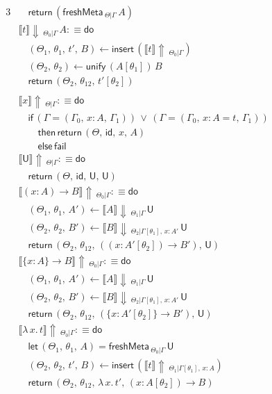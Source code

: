 \documentclass[acmsmall,review,anonymous,prologue,dvipsnames]{acmart}\settopmatter{printfolios=true,printccs=false,printacmref=false}
\newcommand{\slet}{\boldsymbol{\mathsf{let}}}
\renewcommand{\U}{\mathsf{U}}
\newcommand{\id}{\mathsf{id}}
\newcommand{\freshMeta}[3]{\mathsf{freshMeta}\,_{#1|#2}\,#3}
\newcommand{\unify}{\mathsf{unify}}
\newcommand{\fail}{\mathsf{fail}}
\newcommand{\echeck}[4]{\llbracket#1\rrbracket\!\Downarrow\,_{#2|#3}\,#4}
\newcommand{\einfer}[3]{\llbracket#1\rrbracket\!\Uparrow\,_{#2|#3}}
\newcommand{\edo}{\boldsymbol{\mathsf{do}}}
\newcommand{\ereturn}{\boldsymbol{\mathsf{return}}}
\newcommand{\eif}{\boldsymbol{\mathsf{if}}}
\newcommand{\ethen}{\boldsymbol{\mathsf{then}}}
\newcommand{\eelse}{\boldsymbol{\mathsf{else}}}
\newcommand{\einsert}{\mathsf{insert}}
\theoremstyle{remark}
\begin{document}
\begin{alignat*}{3}
  &\quad\ereturn\,(\freshMeta{\Theta}{\Gamma}{A})\\
  &\echeck{t}{\Theta_0}{\Gamma}{A} :\equiv \edo \\
  &\quad(\Theta_1,\,\theta_1,\,t',\,B) \leftarrow \einsert\,(\einfer{t}{\Theta_0}{\Gamma})\\
  &\quad(\Theta_2,\,\theta_2) \leftarrow \unify\,(A[\theta_1])\,B\\
  &\quad\ereturn\,(\Theta_2,\,\theta_{12},\,t'[\theta_2])\\\\
  &\einfer{x}{\Theta}{\Gamma} :\equiv \edo\\
  &\quad\eif\,(\Gamma = (\Gamma_0,\,x : A,\,\Gamma_1))\,\lor\,(\Gamma = (\Gamma_0,\,x : A = t,\,\Gamma_1)) \\
  &\qquad   \ethen\, \ereturn\,(\Theta,\,\id,\,x,\,A)\\
  &\qquad   \eelse\, \fail\\
  &\einfer{\U}{\Theta}{\Gamma} :\equiv \edo\\
  &\quad\ereturn\,(\Theta,\,\id,\,\U,\,\U)\\
  &\einfer{(x : A)\to B}{\Theta_0}{\Gamma} :\equiv \edo\\
  &\quad(\Theta_1,\,\theta_1,\,A') \leftarrow \echeck{A}{\Theta_1}{\Gamma}{\U}\\
  &\quad(\Theta_2,\,\theta_2,\,B') \leftarrow
                 \echeck{B}{\Theta_2}{\Gamma[\theta_1],\,x : A'}{\U}\\
  &\quad\ereturn\,(\Theta_2,\,\theta_{12},
                 \,((x : A'[\theta_2])\to B'),\,\U)\\
  &\einfer{\{x : A\}\to B}{\Theta_0}{\Gamma} :\equiv \edo\\
  &\quad(\Theta_1,\,\theta_1,\,A') \leftarrow \echeck{A}{\Theta_1}{\Gamma}{\U}\\
  &\quad(\Theta_2,\,\theta_2,\,B') \leftarrow
                 \echeck{B}{\Theta_2}{\Gamma[\theta_1],\,x : A'}{\U}\\
  &\quad\ereturn\,(\Theta_2,\,\theta_{12},
                 \,(\{x : A'[\theta_2]\}\to B'),\,\U)\\
  &\einfer{\lambda\,x.\,t}{\Theta_0}{\Gamma} :\equiv \edo \\
  &\quad \slet\, (\Theta_1,\,\theta_1,\,A) = \freshMeta{\Theta_0}{\Gamma}{\U}\\
  &\quad(\Theta_2,\,\theta_2,\,t',\,B)\leftarrow \einsert\,(\einfer{t}{\Theta_1}{\Gamma[\theta_1],\,x:A})\\
  &\quad\ereturn\,(\Theta_2,\,\theta_{12},\,\lambda\,x.\,t',\,(x : A[\theta_2])\to B)\\

\end{alignat*}
\end{document}
